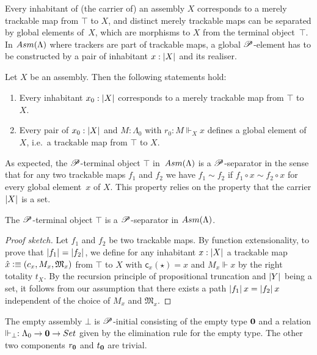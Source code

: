 \documentclass[a4paper,UKenglish,numberwithinsect,cleveref,thm-restate]{lipics-v2021}
\numberwithin{equation}{section}
\theoremstyle{definition}
\theoremstyle{plain}
\begin{document}
Every inhabitant of (the carrier of) an assembly $X$ corresponds to a merely trackable map from $\top$ to $X$, and distinct merely trackable maps can be separated by global elements of~$X$, which are morphisms to $X$ from the terminal object~$\top$.
In $\Asm(\Lambda)$ where trackers are part of trackable maps, a global $\mathscr{P}$-element has to be constructed by a pair of inhabitant $x : \mathopen{}\left|X\right|_{}^{}\mathclose{}$ and its realiser.
\begin{lemma}\label{lem:global-element}
  Let $X$ be an assembly. Then the following statements hold:
  \begin{enumerate}
    \item Every inhabitant $x_0 : \mathopen{}\left|X\right|_{}^{}\mathclose{}$ corresponds to a merely trackable map from $\top$ to $X$.
    \item Every pair of $x_0 : \mathopen{}\left|X\right|_{}^{}\mathclose{}$ and $M : \Lambda_0$ with $r_0 : M \Vdash_X x$ defines a global element of $X$, i.e.\ a trackable map from $\top$ to $X$.
  \end{enumerate}
\end{lemma}

As expected, the $\mathscr{P}$-terminal object $\top$ in~$\Asm(\Lambda)$ is a $\mathscr{P}$-separator in the sense that for any two trackable maps $f_1$ and $f_2$ we have $f_1 \sim f_2$ if $f_1 \circ x \sim f_2 \circ x$ for every global element~$x$ of $X$.
This property relies on the property that the carrier $\mathopen{}\left|X\right|_{}^{}\mathclose{}$ is a set.
\begin{proposition}
  The $\mathscr{P}$-terminal object $\top$ is a $\mathscr{P}$-separator in $\Asm(\Lambda)$.
\end{proposition}
\begin{proof}[Proof sketch]
  Let $f_1$ and $f_2$ be two trackable maps.
  By function extensionality, to prove that $\mathopen{}\left|f_1\right|_{}^{}\mathclose{} = \mathopen{}\left|f_2\right|_{}^{}\mathclose{}$, we define for any inhabitant $x : \mathopen{}\left|X\right|_{}^{}\mathclose{}$ a trackable map $\hat{x} \defeq (\mathsf{c}_x, M_x, \mathfrak{M}_x)$ from $\top$ to $X$  with $\mathsf{c}_x(\star) = x$ and $M_x \Vdash x$ by the right totality $t_X$.
  By the recursion principle of propositional truncation and $\mathopen{}\left|Y\right|_{}^{}\mathclose{}$ being a set, it follows from our assumption that there exists a path $\mathopen{}\left|f_1\right|_{}^{}\mathclose{}\,x = \mathopen{}\left|f_2\right|_{}^{}\mathclose{}\, x$ independent of the choice of $M_x$ and $\mathfrak{M}_x$.
\end{proof}

\begin{example}
The empty assembly $\bot$ is $\mathscr{P}$-initial consisting of the empty type $\mathbf{0}$ and a relation $\Vdash_\bot : \Lambda_0 \to \Empty \to \set$ given by the elimination rule for the empty type.
The other two components $r_\mathbf{0}$ and $t_\mathbf{0}$ are trivial.
\end{example}
\end{document}
